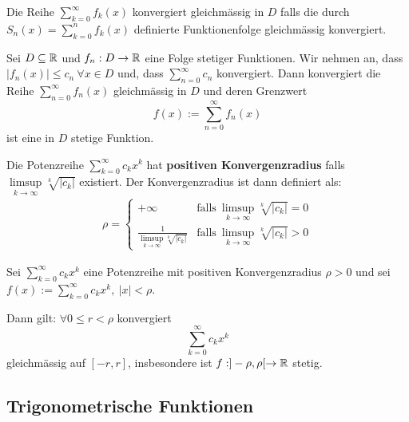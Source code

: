 \begin{definition}{3.37}
    Die Reihe $\sum_{k=0}^\infty f_k(x)$ konvergiert gleichmässig in $D$ falls die durch $S_n(x) = \sum_{k=0}^n f_k(x)$ definierte
    Funktionenfolge gleichmässig konvergiert.
\end{definition}

\begin{satz}{3.38}
    Sei $D \subseteq \mathbb{R}$ und $f_n : D \to \mathbb{R}$ eine Folge stetiger Funktionen. Wir nehmen an, dass $|f_n(x)| \le c_n\ \forall x \in D$
    und, dass $\sum_{n=0}^\infty c_n$ konvergiert. Dann konvergiert die Reihe $\sum_{n=0}^\infty f_n(x)$ gleichmässig in $D$ und deren Grenzwert
    \[ f(x) := \sum_{n=0}^\infty f_n(x) \]
    ist eine in $D$ stetige Funktion.
\end{satz}

\begin{definition}{3.39}
    Die Potenzreihe $\sum_{k=0}^\infty c_k x^k$ hat \textbf{positiven Konvergenzradius} falls $\underset{k \to \infty}{\limsup} \sqrt[k]{|c_k|}$ existiert.
    Der Konvergenzradius ist dann definiert als:
    \begin{align*}
        \rho = \begin{cases}
            +\infty                                                    & \mbox{falls}\ \underset{k \to \infty}{\limsup} \sqrt[k]{|c_k|} = 0 \\
            \frac{1}{\underset{k \to \infty}{\limsup} \sqrt[k]{|c_k|}} & \mbox{falls}\ \underset{k \to \infty}{\limsup} \sqrt[k]{|c_k|} > 0
        \end{cases}
    \end{align*}
\end{definition}

\begin{satz}{3.40}
    Sei $\sum_{k=0}^\infty c_k x^k$ eine Potenzreihe mit positiven Konvergenzradius $\rho > 0$ und sei
    $f(x) := \sum_{k = 0}^\infty c_k x^k,\ |x| < \rho$.

    Dann gilt: $\forall 0 \le r < \rho$ konvergiert
    \[ \sum_{k=0}^\infty c_k x^k \]
    gleichmässig auf $[-r, r]$, insbesondere ist $f: ]-\rho, \rho[ \to \mathbb{R}$ stetig.
\end{satz}

\subsection{Trigonometrische Funktionen}

